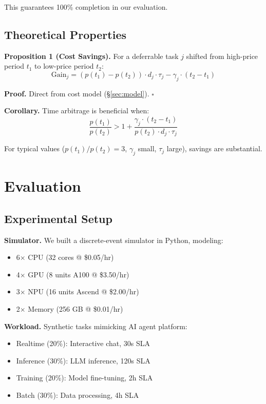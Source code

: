 \documentclass[10pt,conference]{IEEEtran}
\begin{document}
This guarantees 100\% completion in our evaluation.

\subsection{Theoretical Properties}

\textbf{Proposition 1 (Cost Savings).} For a deferrable task $j$ shifted from high-price period $t_1$ to low-price period $t_2$:
\begin{equation}
\text{Gain}_j = (p(t_1) - p(t_2)) \cdot d_j \cdot \tau_j - \gamma_j \cdot (t_2 - t_1)
\end{equation}

\textbf{Proof.} Direct from cost model (\S\ref{sec:model}). $\square$

\textbf{Corollary.} Time arbitrage is beneficial when:
\begin{equation}
\frac{p(t_1)}{p(t_2)} > 1 + \frac{\gamma_j \cdot (t_2 - t_1)}{p(t_2) \cdot d_j \cdot \tau_j}
\end{equation}

For typical values ($p(t_1)/p(t_2) = 3$, $\gamma_j$ small, $\tau_j$ large), savings are substantial.

\section{Evaluation}
\label{sec:evaluation}

\subsection{Experimental Setup}

\textbf{Simulator.} We built a discrete-event simulator in Python, modeling:
\begin{itemize}
    \item 6$\times$ CPU (32 cores @ \$0.05/hr)
    \item 4$\times$ GPU (8 units A100 @ \$3.50/hr)
    \item 3$\times$ NPU (16 units Ascend @ \$2.00/hr)
    \item 2$\times$ Memory (256 GB @ \$0.01/hr)
\end{itemize}

\textbf{Workload.} Synthetic tasks mimicking AI agent platform:
\begin{itemize}
    \item Realtime (20\%): Interactive chat, 30s SLA
    \item Inference (30\%): LLM inference, 120s SLA
    \item Training (20\%): Model fine-tuning, 2h SLA
    \item Batch (30\%): Data processing, 4h SLA
\end{itemize}
\end{document}
